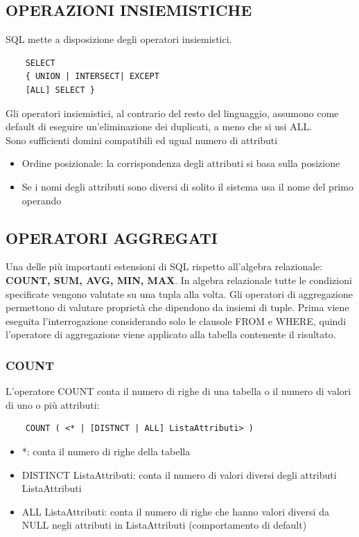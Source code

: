 \documentclass[a4paper]{article}
\begin{document}
\subsection{OPERAZIONI INSIEMISTICHE}

SQL mette a disposizione degli operatori insiemistici.
\begin{verbatim}
    SELECT
    { UNION | INTERSECT| EXCEPT
    [ALL] SELECT }
\end{verbatim}
Gli operatori insiemistici, al contrario del resto del linguaggio,
assumono come default di eseguire un’eliminazione dei duplicati, a
meno che si usi ALL.\\
Sono sufficienti domini compatibili ed ugual numero di attributi
\begin{itemize}
    \item Ordine posizionale: la corrispondenza degli attributi si basa sulla posizione
    \item Se i nomi degli attributi sono diversi di solito il sistema usa il nome del primo
    operando
\end{itemize}

\subsection{OPERATORI AGGREGATI}

Una delle più importanti estensioni di SQL rispetto all’algebra
relazionale: \textbf{COUNT, SUM, AVG, MIN, MAX}.
In algebra relazionale tutte le condizioni specificate vengono
valutate su una tupla alla volta.
Gli operatori di aggregazione permettono di valutare proprietà che
dipendono da insiemi di tuple. Prima viene eseguita l’interrogazione considerando
solo le clausole FROM e WHERE, quindi l’operatore di aggregazione viene applicato alla
tabella contenente il risultato.

\subsubsection{COUNT}

L’operatore COUNT conta il numero di righe di una tabella o il
numero di valori di uno o più attributi:

\begin{verbatim}
    COUNT ( <* | [DISTNCT | ALL] ListaAttributi> )
\end{verbatim}
\noindent
\begin{itemize}
    \item *: conta il numero di righe della tabella
    \item DISTINCT ListaAttributi: conta il numero di valori diversi degli attributi ListaAttributi
    \item ALL ListaAttributi: conta il numero di righe che hanno valori diversi
    da NULL negli attributi in ListaAttributi (comportamento di default)
\end{itemize}
\end{document}
